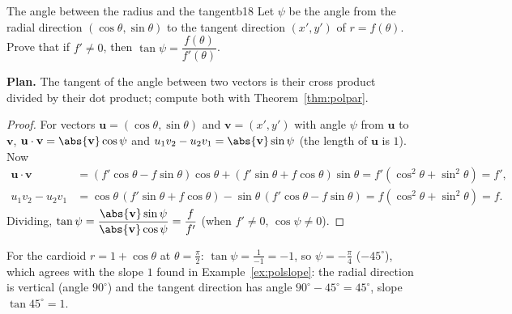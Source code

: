\documentclass[11pt]{article}
\begin{document}
\begin{exmp}{The angle between the radius and the tangent}{b18}
Let $\psi$ be the angle from the radial direction $(\cos\theta,\sin\theta)$ to the tangent direction $(x',y')$ of $r=f(\theta)$. Prove that if $f'\ne0$, then $\tan\psi=\dfrac{f(\theta)}{f'(\theta)}$.

\textbf{Plan.} The tangent of the angle between two vectors is their cross product divided by their dot product; compute both with Theorem~\ref{thm:polpar}.

\begin{proof}
For vectors $\mathbf u=(\cos\theta,\sin\theta)$ and $\mathbf v=(x',y')$ with angle $\psi$ from $\mathbf u$ to $\mathbf v$, $\mathbf u\cdot\mathbf v=\abs{\mathbf v}\cos\psi$ and $u_1v_2-u_2v_1=\abs{\mathbf v}\sin\psi$ (the length of $\mathbf u$ is $1$). Now
\begin{align*}
\mathbf u\cdot\mathbf v&=(f'\cos\theta-f\sin\theta)\cos\theta+(f'\sin\theta+f\cos\theta)\sin\theta=f'\left(\cos^2\theta+\sin^2\theta\right)=f',\\
u_1v_2-u_2v_1&=\cos\theta\,(f'\sin\theta+f\cos\theta)-\sin\theta\,(f'\cos\theta-f\sin\theta)=f\left(\cos^2\theta+\sin^2\theta\right)=f.
\end{align*}
Dividing, $\tan\psi=\dfrac{\abs{\mathbf v}\sin\psi}{\abs{\mathbf v}\cos\psi}=\dfrac f{f'}$ (when $f'\ne0$, $\cos\psi\ne0$).
\end{proof}
For the cardioid $r=1+\cos\theta$ at $\theta=\frac\pi2$: $\tan\psi=\frac{1}{-1}=-1$, so $\psi=-\frac\pi4$ ($-45^\circ$), which agrees with the slope $1$ found in Example~\ref{ex:polslope}: the radial direction is vertical (angle $90^\circ$) and the tangent direction has angle $90^\circ-45^\circ=45^\circ$, slope $\tan45^\circ=1$.
\end{exmp}
\end{document}
